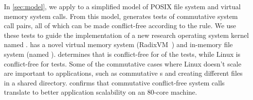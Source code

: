 In \cref{sec:model}, we apply \tool to a simplified model of
 POSIX file system and virtual memory system
calls.
%
From this model,
\tool generates  tests of commutative
system call pairs, all of which can be made conflict-free
according to the rule.  We use these tests to
guide the implementation of a new research operating system kernel
named \sys.  \sys has a novel virtual memory system
(RadixVM~\cite{clements:radixvm}) and in-memory file
system (named \fs).  \tool determines that \sys is conflict-free for
 of the
 tests, while Linux is conflict-free
for 
tests.  Some of the commutative cases where Linux doesn't scale are important
to applications, such as commutative
s and creating different files in a shared directory.
 confirms that commutative conflict-free system calls
translate to better application scalability on an 80-core machine.


